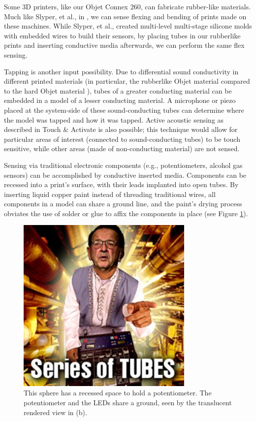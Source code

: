 Some 3D printers, like our Objet Connex 260, can fabricate rubber-like materials.  Much like Slyper, et al., in \cite{Slyper-shape}, we can sense flexing and bending of prints made on these machines.  While Slyper, et al., created multi-level multi-stage silicone molds with embedded wires to build their sensors, by placing tubes in our rubberlike prints and inserting conductive media afterwards, we can perform the same flex sensing.

Tapping is another input possibility.  Due to differential sound conductivity in different printed materials (in particular, the rubberlike Objet material compared to the hard Objet material ), tubes of a greater conducting material can be embedded in a model of a lesser conducting material.  A microphone or piezo placed at the system-side of these sound-conducting tubes can determine where the model was tapped and how it was tapped.  Active acoustic sensing as described in Touch \& Activate \cite{Ono-touchandactivate} is also possible; this technique would allow for particular areas of interest (connected to sound-conducting tubes) to be touch sensitive, while other areas (made of non-conducting material) are not sensed.

Sensing via traditional electronic components (e.g., potentiometers, alcohol gas sensors) can be accomplished by conductive inserted media.  Components can be recessed into a print's surface, with their leads implanted into open tubes.  By inserting liquid copper paint instead of threading traditional wires, all components in a model can share a ground line, and the paint's drying process obviates the use of solder or glue to affix the components in place (see Figure \ref{fig:embeddedcomponents}).

\begin{figure}[h]
\centering
    \includegraphics[width=3.4in]{figures/series-of-tubes.jpg}
\caption{This sphere has a recessed space to hold a potentiometer.  The potentiometer and the LEDs share a ground, seen by the translucent rendered view in (b).}
\label{fig:embeddedcomponents}
\end{figure}


